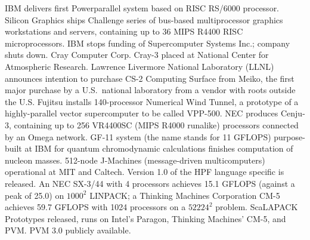 	{IBM delivers first Powerparallel system based on RISC RS/6000 processor.}
        {Silicon Graphics ships Challenge series of bus-based multiprocessor
	graphics workstations and servers,
	containing up to 36 MIPS R4400 RISC microprocessors.}
	{IBM stops funding of Supercomputer Systems Inc.;
	company shuts down.}
	{Cray Computer Corp. Cray-3 placed at
	National Center for Atmospheric Research.}
	{Lawrence Livermore National Laboratory (LLNL)
	announces intention to purchase CS-2 Computing Surface from Meiko,
	the first major purchase by a U.S.\ national laboratory
	from a vendor with roots outside the U.S.}
	{Fujitsu installs 140-processor Numerical Wind Tunnel,
	a prototype of a highly-parallel vector supercomputer
	to be called VPP-500.}
	{NEC produces Cenju-3,
	containing up to 256 VR4400SC (MIPS R4000 runalike) processors
	connected by an Omega network.}
	{GF-11 system (the name stands for 11 GFLOPS)
	purpose-built at IBM for quantum chromodynamic calculations
	finishes computation of nucleon masses.}
	{512-node J-Machines (message-driven multicomputers) operational
	at MIT and Caltech.}
	{Version 1.0 of the HPF language specific is released.}
	{An NEC SX-3/44 with 4 processors achieves 15.1 GFLOPS
	(against a peak of 25.0)
	on $1000^2$ LINPACK;
	a Thinking Machines Corporation CM-5 achieves
	59.7 GFLOPS with 1024 processors
	on a $52224^2$ problem.}
        {ScaLAPACK Prototypes released, runs on Intel's Paragon, Thinking
	Machines' CM-5, and PVM.
	PVM 3.0 publicly available.}





